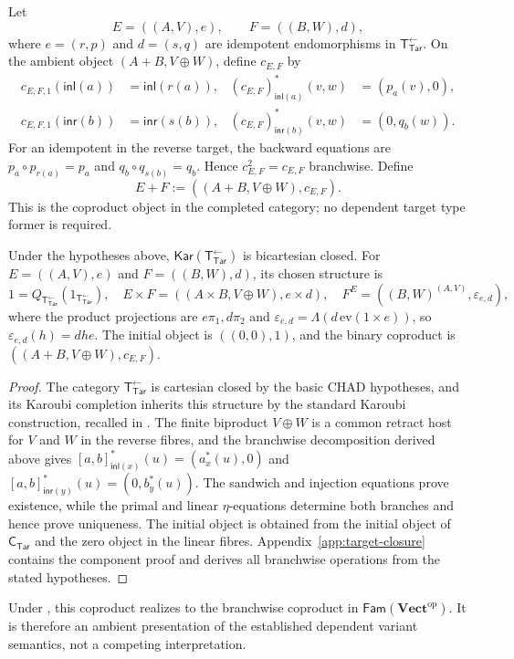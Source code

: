 \documentclass[runningheads,envcountsame]{llncs}
\newcommand{\Vectop}{\mathbf{Vect}^{\mathrm{op}}}
\newcommand{\Tar}{\mathsf{Tar}}
\newcommand{\CTar}{\mathsf C_{\Tar}}
\newcommand{\TotTar}{\mathsf T_{\Tar}^{\leftarrow}}
\newcommand{\Fam}{\mathsf{Fam}}
\newcommand{\Kar}{\mathsf{Kar}}
\begin{document}
Let
$$
E=((A,V),e),
\qquad
F=((B,W),d),
$$
where $e=(r,p)$ and $d=(s,q)$ are idempotent endomorphisms in $\TotTar$. On the ambient object $(A+B,V\oplus W)$, define $c_{E,F}$ by
$$
\begin{aligned}
c_{E,F,1}(\mathsf{inl}(a))&=\mathsf{inl}(r(a)),
&
(c_{E,F})^*_{\mathsf{inl}(a)}(v,w)&=(p_a(v),0),\\
c_{E,F,1}(\mathsf{inr}(b))&=\mathsf{inr}(s(b)),
&
(c_{E,F})^*_{\mathsf{inr}(b)}(v,w)&=(0,q_b(w)).
\end{aligned}
$$
For an idempotent in the reverse target, the backward equations are $p_a\circ p_{r(a)}=p_a$ and $q_b\circ q_{s(b)}=q_b$. Hence $c_{E,F}^2=c_{E,F}$ branchwise. Define
$$
E+F:=((A+B,V\oplus W),c_{E,F}).
$$
This is the coproduct object in the completed category; no dependent target type former is required.

\begin{proposition}
\label{prop:bcc}
Under the hypotheses above, $\Kar(\TotTar)$ is bicartesian closed. For
$E=((A,V),e)$ and $F=((B,W),d)$, its chosen structure is
$$
1=Q_{\TotTar}(1_{\TotTar}),
\quad
E\times F=((A\times B,V\oplus W),e\times d),
\quad
F^E=((B,W)^{(A,V)},\varepsilon_{e,d}),
$$
where the product projections are $e\pi_1,d\pi_2$ and
$\varepsilon_{e,d}=\Lambda(d\,\mathrm{ev}(1\times e))$, so
$\varepsilon_{e,d}(h)=dhe$. The initial object is $((0,0),1)$, and the binary coproduct is $((A+B,V\oplus W),c_{E,F})$.
\end{proposition}

\begin{proof}
The category $\TotTar$ is cartesian closed by the basic CHAD hypotheses, and its Karoubi completion inherits this structure by the standard Karoubi construction, recalled in . The finite biproduct $V\oplus W$ is a common retract host for $V$ and $W$ in the reverse fibres, and the branchwise decomposition derived above gives
$[a,b]^*_{\mathsf{inl}(x)}(u)=(a_x^*(u),0)$ and
$[a,b]^*_{\mathsf{inr}(y)}(u)=(0,b_y^*(u))$.
The sandwich and injection equations prove existence, while the primal and linear $\eta$-equations determine both branches and hence prove uniqueness. The initial object is obtained from the initial object of $\CTar$ and the zero object in the linear fibres. Appendix~\ref{app:target-closure} contains the component proof and derives all branchwise operations from the stated hypotheses.
\end{proof}

Under , this coproduct realizes to the branchwise coproduct in $\Fam(\Vectop)$. It is therefore an ambient presentation of the established dependent variant semantics, not a competing interpretation.
\end{document}
